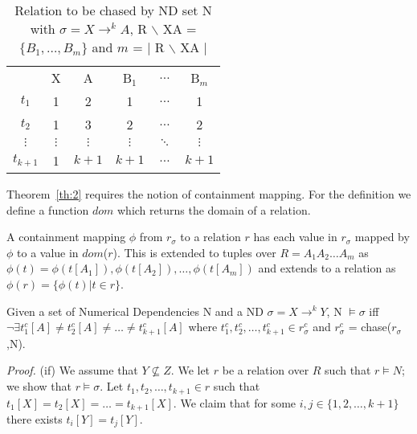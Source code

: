 {\line
\begin{table}[ht]
\begin{center}
\begin{tabular}{c|c|c|c|c|c|} \cline{2-6}
 	& X 	& A 	& B$_1$ & $\ldots$ 	& B$_m$ \\ \cline{2-6}
$t_1$ 	& 1  	&  2  	& 1 	& $\ldots$ 	& 1 \\
$t_2$ 	& 1  	&  3  	& 2 	&  $\ldots$ 	& 2 \\
$\vdots$ & $\vdots$  &  $\vdots$  & $\vdots$ & $\ddots$ & $\vdots$ \\
$t_{k+1}$ & 1  &  $k+1$  & $k+1$ & $\ldots$ 	& $k+1$ \\ \cline{2-6}
\end{tabular}
\end{center}
\caption{\label{tbl:1.0} Relation to be chased by ND set N with
$\sigma = X \to^k A$, R $\backslash$ XA = $\{ B_1, \ldots, B_m \}$
and $m$ = $|$ R $\backslash$ XA $|$}
\end{table}}

Theorem~\ref{th:2} requires the notion of containment mapping.
For the definition we define a function $dom$ which returns the domain
of a relation.

\begin{definition}\label{def:cm}
\begin{rm}
A containment mapping $\phi$ from $r_\sigma$ to a relation $r$ has
each value in $r_\sigma$ mapped by $\phi$ to a value in $dom$($r$).
This is extended to tuples over $R = A_1A_2 \ldots A_m$ as $\phi(t) =
\phi(t[A_1]),\phi(t[A_2]),\ldots, \phi(t[A_m])$ and extends to a
relation as $\phi(r) = \{ \phi(t) | t \in r \}$.
\end{rm}
\end{definition}

\begin{theorem}\label{th:2}
\begin{rm}
Given a set of Numerical Dependencies N and a ND $\sigma = X \to^k Y$,
N $\models \sigma$ iff $\neg\exists t^c_1[A] \not= t^c_2[A] \not= \ldots
\not= t^c_{k+1}[A]$ where $t^c_1,t^c_2,\ldots,t^c_{k+1} \in
r_\sigma^c$ and $r_\sigma^c$ = chase($r_\sigma$,N).
\end{rm}
\end{theorem}

{\em Proof.} (if) We assume that $Y \not\subseteq Z$. We let $r$ be a
relation over $R$ such that $r \models N$; we show that $r \models
\sigma$. Let $t_1, t_2, \ldots, t_{k+1} \in r$ such that $t_1[X] =
t_2[X] = \ldots = t_{k+1}[X]$. We claim that for some $i,
j \in \{1, 2, \ldots, {k+1}\}$ there exists $t_i[Y] = t_j[Y]$.

